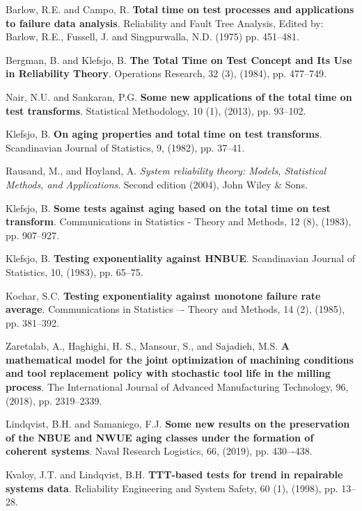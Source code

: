 \documentclass[preprint,12pt]{elsarticle}
\begin{document}
\begin{thebibliography}{}
 Barlow, R.E. and Campo, R. \textbf{Total time on test processes and applications to failure data analysis}. Reliability and Fault Tree Analysis, Edited by: Barlow, R.E., Fussell, J. and Singpurwalla, N.D. (1975) pp. 451--481.

 Bergman, B. and Klefsjo, B. \textbf{The Total Time on Test Concept and Its Use in Reliability Theory}. Operations Research, 32 (3), (1984), pp. 477--749.

 Nair, N.U. and Sankaran, P.G. \textbf{Some new applications of the total time on test transforms}. Statistical Methodology, 10 (1), (2013), pp. 93--102.


 Klefsjo, B. \textbf{On aging properties and total time on test transforms}. Scandinavian Journal of Statistics, 9, (1982), pp. 37--41.

 Rausand, M., and Hoyland, A. \textit{System reliability theory: Models, Statistical Methods, and Applications}. Second edition (2004), John Wiley $\&$ Sons. 

 Klefsjo, B. \textbf{Some tests against aging based on the total time on test transform}. Communications in Statistics - Theory and Methods, 12 (8), (1983), pp. 907--927.

 Klefsjo, B. \textbf{Testing exponentiality against HNBUE}. Scandinavian Journal of Statistics, 10, (1983), pp. 65--75.

 Kochar, S.C. \textbf{Testing exponentiality against monotone failure rate average}. Communications in Statistics –- Theory and Methods, 14 (2), (1985), pp. 381–392.

 Zaretalab, A., Haghighi, H. S., Mansour, S., and Sajadieh, M.S. \textbf{A mathematical model for the joint optimization of machining conditions and tool replacement policy with stochastic tool life in the milling process}. The International Journal of Advanced Manufacturing Technology, 96, (2018), pp. 2319--2339.

 Lindqvist, B.H. and Samaniego, F.J. {\bf Some new results on the preservation of the NBUE and NWUE aging classes under the formation of coherent systems}. Naval Research Logistics, 66, (2019), pp. 430–-438.

 Kvaloy, J.T. and Lindqvist, B.H. \textbf{TTT-based tests for trend in repairable systems data}. Reliability Engineering and System Safety, 60 (1), (1998), pp. 13--28.


\end{thebibliography}
\end{document}
